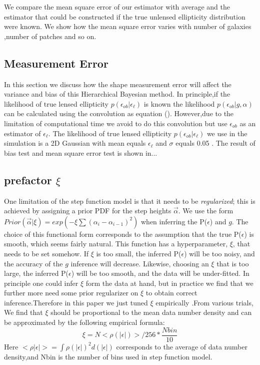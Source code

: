\documentclass[useAMS,usenatbib]{mn2e}
\begin{document}
We compare the mean square error of our estimator with average and
the estimator that could be constructed if the true unlensed ellipticity
distribution were known. We show how the mean square error varies
with number of galaxies ,number of patches and so on.


\subsection{Measurement Error}
In this section we  discuss how the shape measurement error will
affect the variance and bias of this Hierarchical Bayesian method.
In principle,if the likelihood of true lensed ellipticity $p(\epsilon_{ob}|\epsilon_{\ell})$
is known the likelihood $p(\epsilon_{ob}|g,\alpha)$ can be calculated using the convolution as equation ().
However,due to the limitation of computational time we avoid to do this convolution but use $\epsilon_{ob}$
as an estimator of $\epsilon_{\ell}$.
The likelihood of true lensed ellipticity $p(\epsilon_{ob}|\epsilon_{\ell})$ we use in the simulation is a 2D
Gaussian with mean equals $\epsilon_{\ell}$ and $\sigma$ equals 0.05 .
The result of bias test and mean square error test is shown in...




\subsection{prefactor $\xi$}

One limitation of the step function model is that it needs to be \textit{regularized};
this is achieved by assigning a prior PDF for the step heights $\vec{\alpha}$.
We use the form $Prior(\vec{\alpha}|\xi)=exp(-\xi\sum(\alpha_{i}-\alpha_{i-1})^{2})$
when inferring the P($\epsilon$) and $g$. The choice of this functional
form corresponds to the assumption that the true P($\epsilon$) is
smooth, which seems fairly natural. This function has a hyperparameter,
$\xi$, that needs to be set somehow. If $\xi$ is too small, the
inferred P($\epsilon$) will be too noisy, and the accuracy of the
$g$ inference will decrease. Likewise, choosing an $\xi$ that is
too large, the inferred P($\epsilon$) will be too smooth, and the
data will be under-fitted. In principle one could infer $\xi$ form
the data at hand, but in practice we find that we further more need some
prior regularizer on $\xi$ to obtain correct inference.Therefore in this paper 
we just tuned $\xi$ empirically .From various trials, We find
that $\xi$ should be proportional to the mean data number density and can
be approximated by the following empirical formula: 
\begin{equation}
\xi=N<\rho(|\epsilon|)>/256*\frac{Nbin}{10}
\end{equation}
Here $<\rho|\epsilon|>=\int\rho(|\epsilon|)^{2}d(|\epsilon|)$ corresponds
to the average of data number density,and Nbin is the number of bins used 
in step function model. 
\end{document}
